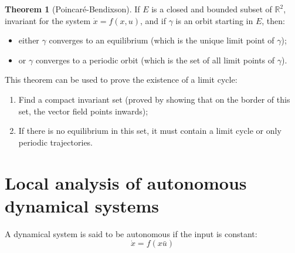\documentclass[12pt, openany]{report}
\theoremstyle{definition}
\newtheorem{thm}{Theorem}[chapter]
\newcommand{\R}{\mathbb{R}}
\begin{document}
\begin{thm}[Poincaré-Bendixson]
    If \(E\) is a closed and bounded subset of \(\R^2\), invariant for the system \(\dot x=f(x,u)\), and if \(\gamma\) is an orbit starting in \(E\), then:
    \begin{itemize}
        \item either \(\gamma\) converges to an equilibrium (which is the unique limit point of \(\gamma\));
        \item or \(\gamma\) converges to a periodic orbit (which is the set of all limit points of \(\gamma\)).
    \end{itemize}
\end{thm}
This theorem can be used to prove the existence of a limit cycle:
\begin{enumerate}
    \item Find a compact invariant set (proved by showing that on the border of this set, the vector field points inwards);
    \item If there is no equilibrium in this set, it must contain a limit cycle or only periodic trajectories.
\end{enumerate}
\chapter{Local analysis of autonomous dynamical systems}
A dynamical system is said to be autonomous if the input is constant:
\begin{equation}
    \dot x= f(x\bar u)
\end{equation}
\end{document}
